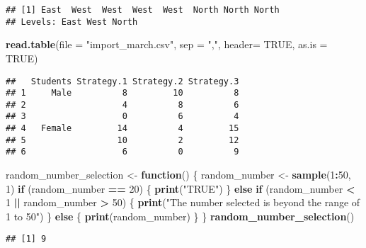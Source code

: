 \documentclass[
]{article}
\newenvironment{Shaded}{\begin{snugshade}}{\end{snugshade}}
\newcommand{\AttributeTok}[1]{\textcolor[rgb]{0.13,0.29,0.53}{#1}}
\newcommand{\ConstantTok}[1]{\textcolor[rgb]{0.56,0.35,0.01}{#1}}
\newcommand{\ControlFlowTok}[1]{\textcolor[rgb]{0.13,0.29,0.53}{\textbf{#1}}}
\newcommand{\DecValTok}[1]{\textcolor[rgb]{0.00,0.00,0.81}{#1}}
\newcommand{\FunctionTok}[1]{\textcolor[rgb]{0.13,0.29,0.53}{\textbf{#1}}}
\newcommand{\NormalTok}[1]{#1}
\newcommand{\OtherTok}[1]{\textcolor[rgb]{0.56,0.35,0.01}{#1}}
\newcommand{\SpecialCharTok}[1]{\textcolor[rgb]{0.81,0.36,0.00}{\textbf{#1}}}
\newcommand{\StringTok}[1]{\textcolor[rgb]{0.31,0.60,0.02}{#1}}
\begin{document}
\begin{verbatim}
## [1] East  West  West  West  West  North North North
## Levels: East West North
\end{verbatim}

\begin{Shaded}
\begin{Highlighting}[]
\FunctionTok{read.table}\NormalTok{(}\AttributeTok{file =} \StringTok{"import\_march.csv"}\NormalTok{, }\AttributeTok{sep =} \StringTok{","}\NormalTok{, }\AttributeTok{header=} \ConstantTok{TRUE}\NormalTok{, }\AttributeTok{as.is =} \ConstantTok{TRUE}\NormalTok{)}
\end{Highlighting}
\end{Shaded}

\begin{verbatim}
##   Students Strategy.1 Strategy.2 Strategy.3
## 1     Male          8         10          8
## 2                   4          8          6
## 3                   0          6          4
## 4   Female         14          4         15
## 5                  10          2         12
## 6                   6          0          9
\end{verbatim}

\begin{Shaded}
\begin{Highlighting}[]
\NormalTok{random\_number\_selection }\OtherTok{\textless{}{-}} \ControlFlowTok{function}\NormalTok{() \{}
\NormalTok{  random\_number }\OtherTok{\textless{}{-}} \FunctionTok{sample}\NormalTok{(}\DecValTok{1}\SpecialCharTok{:}\DecValTok{50}\NormalTok{, }\DecValTok{1}\NormalTok{)}
  \ControlFlowTok{if}\NormalTok{ (random\_number }\SpecialCharTok{==} \DecValTok{20}\NormalTok{) \{}
    \FunctionTok{print}\NormalTok{(}\StringTok{"TRUE"}\NormalTok{)}
\NormalTok{  \} }\ControlFlowTok{else} \ControlFlowTok{if}\NormalTok{ (random\_number }\SpecialCharTok{\textless{}} \DecValTok{1} \SpecialCharTok{||}\NormalTok{ random\_number }\SpecialCharTok{\textgreater{}} \DecValTok{50}\NormalTok{) \{}
    \FunctionTok{print}\NormalTok{(}\StringTok{"The number selected is beyond the range of 1 to 50"}\NormalTok{)}
\NormalTok{  \} }\ControlFlowTok{else}\NormalTok{ \{}
    \FunctionTok{print}\NormalTok{(random\_number)}
\NormalTok{  \}}
\NormalTok{\}}
\FunctionTok{random\_number\_selection}\NormalTok{()}
\end{Highlighting}
\end{Shaded}

\begin{verbatim}
## [1] 9
\end{verbatim}
\end{document}
